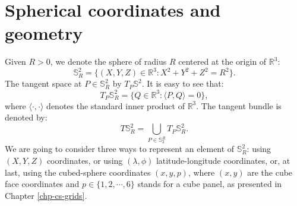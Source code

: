 \chapter{Spherical coordinates and geometry}
\label{anexo-sph}

Given $R>0$, we denote the sphere of radius $R$ 
centered at the origin of  $\mathbb{R}^3$:
\begin{equation*}
	\mathbb{S}^2_R = \{(X,Y,Z) \in \mathbb{R}^3: X^2 + Y^2 + Z^2 = R^2\}.
\end{equation*}
The tangent space at $P \in \mathbb{S}^2_R$ by $T_P \mathbb{S}^2$.
It is easy to see that:
\begin{equation*}
	T_P\mathbb{S}^2_R = \{Q \in \mathbb{R}^3: \langle P,Q\rangle = 0\},
\end{equation*}
where $\langle \cdot, \cdot \rangle$ denotes 
the standard inner product of $\mathbb{R}^3$.
The tangent bundle is denoted by:
\begin{equation*}
T\mathbb{S}_R^2 = \bigcup_{P\in \mathbb{S}^R_2} T_P \mathbb{S}_R^2.
\end{equation*}
We are going to consider three ways to represent an element of $\mathbb{S}_R^2$:
using $(X,Y,Z)$ coordinates, or using $(\lambda, \phi)$
latitude-longitude coordinates, or, at last, using the cubed-sphere
coordinates $(x,y,p)$, where $(x,y)$ are the cube face coordinates and 
$p \in \{1,2,\cdots, 6\}$ stands for a cube panel, as presented in 
Chapter \ref{chp-cs-grids}.

